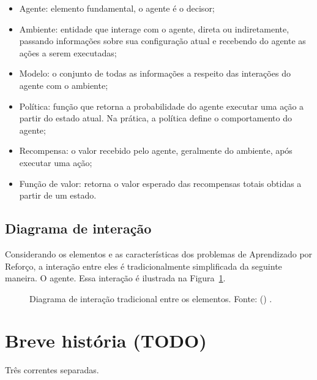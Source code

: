 \documentclass{article}
\begin{document}
        \begin{itemize}
            \item Agente: elemento fundamental, o agente é o decisor;
            \item Ambiente: entidade que interage com o agente, direta ou indiretamente, passando informações sobre sua configuração atual e recebendo do agente as ações a serem executadas;
            \item Modelo: o conjunto de todas as informações a respeito das interações do agente com o ambiente;
            \item Política: função que retorna a probabilidade do agente executar uma ação a partir do estado atual. Na prática, a política define o comportamento do agente;
            \item Recompensa: o valor recebido pelo agente, geralmente do ambiente, após executar uma ação;
            \item Função de valor: retorna o valor esperado das recompensas totais obtidas a partir de um estado.
        \end{itemize}
        
        \subsection{Diagrama de interação}
    
            Considerando os elementos e as características dos problemas de Aprendizado por Reforço, a interação entre eles é tradicionalmente simplificada da seguinte maneira. 
            O agente. 
            Essa interação é ilustrada na Figura~\ref{diag:classical-rl}.
        
            \begin{figure}[ht]
                \centering
                \vspace*{5mm}
                \rlinteraction
                \vspace*{-5mm}
                \caption{Diagrama de interação tradicional entre os elementos. Fonte: \citeauthor{Sutton2018} (\citeyear{Sutton2018}) \cite{Sutton2018}.}
                \label{diag:classical-rl}
            \end{figure}
    
    \section{Breve história (TODO)}
    
        Três correntes separadas.
        
\end{document}
